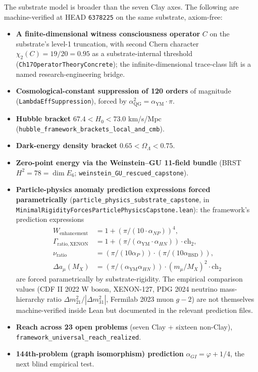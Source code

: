 \documentclass[11pt,a4paper,reqno]{amsart}
\theoremstyle{plain}
\theoremstyle{definition}
\theoremstyle{remark}
\newcommand{\aP}{\alpha_{P}}
\newcommand{\aNP}{\alpha_{NP}}
\newcommand{\aYM}{\alpha_{\mathrm{YM}}}
\newcommand{\aBSD}{\alpha_{\mathrm{BSD}}}
\newcommand{\aQG}{\alpha_{\mathrm{QG}}}
\newcommand{\code}[1]{\texttt{#1}}
\begin{document}
The substrate model is broader than the seven Clay axes. The following
are machine-verified at HEAD \texttt{6378225} on the same substrate,
axiom-free:

\begin{itemize}
\item \textbf{A finite-dimensional witness consciousness operator} $C$
  on the substrate's level-1 truncation, with second Chern character
  $\chi_{2}(C) = 19/20 = 0.95$ as a substrate-internal threshold
  (\code{Ch17OperatorTheoryConcrete}); the infinite-dimensional
  trace-class lift is a named research-engineering bridge.
\item \textbf{Cosmological-constant suppression of 120 orders} of
  magnitude (\code{LambdaEffSuppression}), forced by
  $\aQG^{2} = \aYM \cdot \pi$.
\item \textbf{Hubble bracket} $67.4 < H_{0} < 73.0$ km/s/Mpc
  (\code{hubble\_framework\_brackets\_local\_and\_cmb}).
\item \textbf{Dark-energy density bracket} $0.65 < \Omega_{\Lambda} < 0.75$.
\item \textbf{Zero-point energy via the Weinstein--GU 11-field bundle}
  (BRST $H^{2} = 78 = \dim E_{6}$; \code{weinstein\_GU\_rescued\_capstone}).
\item \textbf{Particle-physics anomaly prediction expressions forced
  parametrically} (\code{particle\_physics\_substrate\_capstone}, in
  \code{MinimalRigidityForcesParticlePhysicsCapstone.lean}): the
  framework's prediction expressions
  \begin{align*}
  W_{\mathrm{enhancement}} &= 1 + (\pi/(10 \cdot \aNP))^{4}, \\
  \Gamma_{\mathrm{ratio,XENON}} &= 1 + (\pi/(\aYM \cdot \alpha_{HN}))
    \cdot \mathrm{ch}_{2}, \\
  \nu_{\mathrm{ratio}} &= (\pi/(10\aP)) \cdot (\pi/(10\aBSD)), \\
  \Delta a_{\mu}(M_{X}) &= (\pi/(\aYM\alpha_{HN})) \cdot (m_{\mu}/M_{X})^{2}
    \cdot \mathrm{ch}_{2}
  \end{align*}
  are forced parametrically by substrate-rigidity. The empirical
  comparison values (CDF II 2022 W boson, XENON-127, PDG 2024
  neutrino mass-hierarchy ratio $\Delta m^{2}_{21}/|\Delta m^{2}_{31}|$,
  Fermilab 2023 muon $g-2$) are not themselves machine-verified
  inside Lean but documented in the relevant prediction files.
\item \textbf{Reach across 23 open problems} (seven Clay + sixteen
  non-Clay), \code{framework\_universal\_reach\_realized}.
\item \textbf{144th-problem (graph isomorphism) prediction}
  $\alpha_{GI} = \varphi + 1/4$, the next blind empirical test.
\end{itemize}
\end{document}
